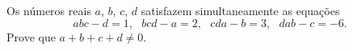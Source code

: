 Os números reais $a$, $b$, $c$, $d$ satisfazem simultaneamente as equações \[abc -d = 1, \ \ \  bcd - a = 2, \ \ \   cda- b = 3, \ \ \   dab - c = -6.\] Prove que $a + b + c + d \neq 0$.
